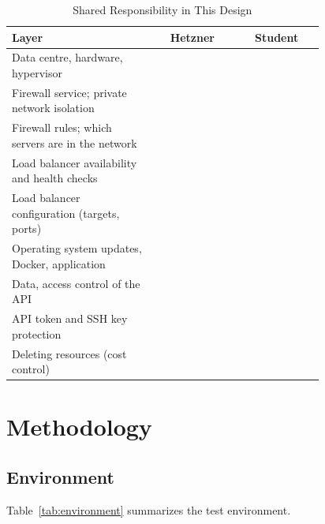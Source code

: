 \documentclass[conference,a4paper]{IEEEtran}
\begin{document}
\begin{table}[htbp]
	\caption{Shared Responsibility in This Design}
	\label{tab:responsibility}
	\centering
	\footnotesize
	\begin{tabular}{|p{0.46\linewidth}|c|c|}
		\hline
		\textbf{Layer} & \textbf{Hetzner} & \textbf{Student} \\
		\hline
		Data centre, hardware, hypervisor & \checkmark & \\
		\hline
		Firewall service; private network isolation & \checkmark & \\
		\hline
		Firewall rules; which servers are in the network & & \checkmark \\
		\hline
		Load balancer availability and health checks & \checkmark & \\
		\hline
		Load balancer configuration (targets, ports) & & \checkmark \\
		\hline
		Operating system updates, Docker, application & & \checkmark \\
		\hline
		Data, access control of the API & & \checkmark \\
		\hline
		API token and SSH key protection & & \checkmark \\
		\hline
		Deleting resources (cost control) & & \checkmark \\
		\hline
	\end{tabular}
\end{table}

\section{Methodology}
\label{sec:methodology}

\subsection{Environment}

Table~\ref{tab:environment} summarizes the test environment.
\end{document}
